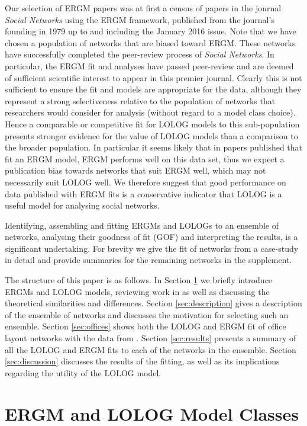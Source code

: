 \documentclass[
]{statsoc}
\begin{document}
Our selection of ERGM papers was at first a census of papers in the
journal \textit{Social Networks} using the ERGM framework, published
from the journal's founding in 1979 up to and including the January 2016
issue. Note that we have chosen a population of networks that are biased
toward ERGM. These networks have successfully completed the peer-review
process of \textit{Social Networks}. In particular, the ERGM fit and
analyses have passed peer-review and are deemed of sufficient scientific
interest to appear in this premier journal. Clearly this is not
sufficient to ensure the fit and models are appropriate for the data,
although they represent a strong selectiveness relative to the
population of networks that researchers would consider for analysis
(without regard to a model class choice). Hence a comparable or
competitive fit for LOLOG models to this sub-population presents
stronger evidence for the value of LOLOG models than a comparison to the
broader population. In particular it seems likely that in papers
published that fit an ERGM model, ERGM performs well on this data set,
thus we expect a publication bias towards networks that suit ERGM well,
which may not necessarily suit LOLOG well. We therefore suggest that
good performance on data published with ERGM fits is a conservative
indicator that LOLOG is a useful model for analysing social networks.

Identifying, assembling and fitting ERGMs and LOLOGs to an ensemble of
networks, analysing their goodness of fit (GOF) and interpreting the
results, is a significant undertaking. For brevity we give the fit of
networks from a case-study \citep{Sailer2012} in detail and provide
summaries for the remaining networks in the supplement.

The structure of this paper is as follows. In Section \ref{sec:LOLOG} we
briefly introduce ERGMs and LOLOG models, reviewing work in
\cite{Fellows2018} as well as discussing the theoretical similarities
and differences. Section \ref{sec:description} gives a description of
the ensemble of networks and discusses the motivation for selecting such
an ensemble. Section \ref{sec:offices} shows both the LOLOG and ERGM fit
of office layout networks with the data from \cite{Sailer2012}. Section
\ref{sec:results} presents a summary of all the LOLOG and ERGM fits to
each of the networks in the ensemble. Section \ref{sec:discussion}
discusses the results of the fitting, as well as its implications
regarding the utility of the LOLOG model.

\section{ERGM and LOLOG Model Classes}\label{sec:LOLOG}
\end{document}
